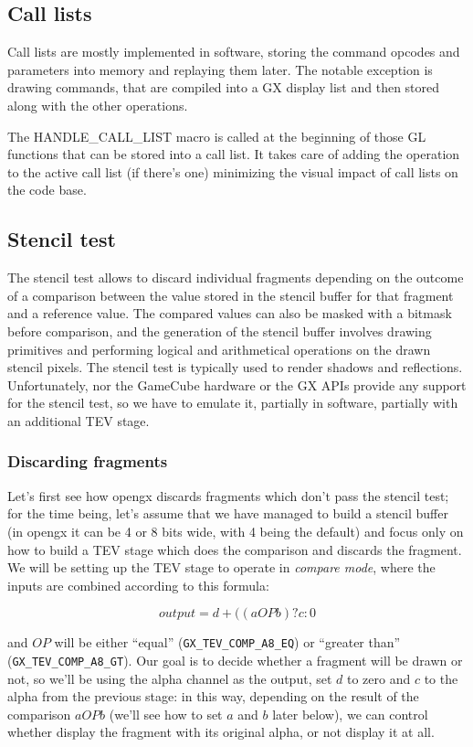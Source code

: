 \documentclass[12pt]{article}
\begin{document}
\subsection {Call lists}

Call lists are mostly implemented in software, storing the command opcodes and parameters into memory and replaying them later. The notable exception is drawing commands, that are compiled into a GX display list and then stored along with the other operations.

The HANDLE\_CALL\_LIST macro is called at the beginning of those GL functions that can be stored into a call list. It takes care of adding the operation to the active call list (if there's one) minimizing the visual impact of call lists on the code base.


\subsection {Stencil test}

The stencil test allows to discard individual fragments depending on the outcome of a comparison between the value stored in the stencil buffer for that fragment and a reference value. The compared values can also be masked with a bitmask before comparison, and the generation of the stencil buffer involves drawing primitives and performing logical and arithmetical operations on the drawn stencil pixels. The stencil test is typically used to render shadows and reflections. Unfortunately, nor the GameCube hardware or the GX APIs provide any support for the stencil test, so we have to emulate it, partially in software, partially with an additional TEV stage.

\subsubsection {Discarding fragments}

Let's first see how opengx discards fragments which don't pass the stencil test; for the time being, let's assume that we have managed to build a stencil buffer (in opengx it can be 4 or 8 bits wide, with 4 being the default) and focus only on how to build a TEV stage which does the comparison and discards the fragment. We will be setting up the TEV stage to operate in \emph{compare mode}, where the inputs are combined according to this formula:

    $$ output = d + ((a OP b) ? c : 0 $$

and $OP$ will be either “equal” (\lstinline{GX_TEV_COMP_A8_EQ}) or “greater than” (\lstinline{GX_TEV_COMP_A8_GT}). Our goal is to decide whether a fragment will be drawn or not, so we'll be using the alpha channel as the output, set $d$ to zero and $c$ to the alpha from the previous stage: in this way, depending on the result of the comparison $a OP b$ (we'll see how to set $a$ and $b$ later below), we can control whether display the fragment with its original alpha, or not display it at all.
\end{document}
